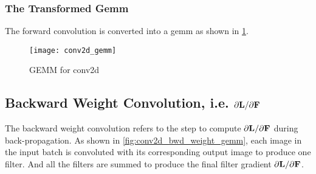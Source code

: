 

\subsubsection{The Transformed Gemm}

The forward convolution is converted into a gemm as shown in
\Fig \ref{fig:conv2d_GEMM}.

{}
\begin{figure}[!h]
  \centering
  \texttt{[image: conv2d\_gemm]}



  \caption{GEMM for conv2d}
  \label{fig:conv2d_GEMM}
\end{figure}


\subsection{Backward Weight Convolution, i.e. $\partial \bold{L}/\partial \bold{F}$}
The backward weight convolution refers to the step to compute $\partial \bold{L}/\partial \bold{F}$
during back-propagation.
As shown in \Fig \ref{fig:conv2d_bwd_weight_gemm}, each image in the input batch is convoluted
with its corresponding output image to produce one filter.
And all the filters are summed to produce the final filter gradient $\partial \bold{L}/\partial \bold{F}$.


